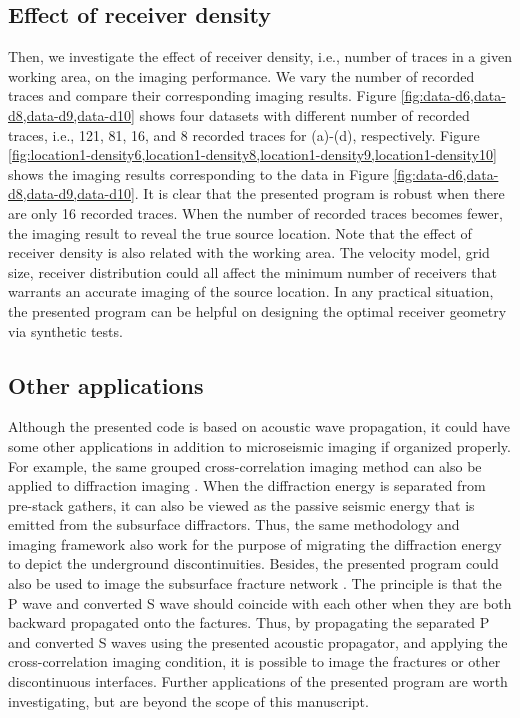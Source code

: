 \subsection{Effect of receiver density}
Then, we investigate the effect of receiver density, i.e., number of traces in a given working area, on the imaging performance. We vary the number of recorded traces and compare their corresponding imaging results. Figure \ref{fig:data-d6,data-d8,data-d9,data-d10} shows four datasets with different number of recorded traces, i.e.,  121, 81, 16, and 8 recorded traces for (a)-(d), respectively. Figure \ref{fig:location1-density6,location1-density8,location1-density9,location1-density10} shows the imaging results corresponding to the data in Figure \ref{fig:data-d6,data-d8,data-d9,data-d10}. It is clear that the presented program is robust when there are only 16 recorded traces. When the number of recorded traces becomes fewer, the imaging result  to reveal the true source location. Note that the effect of receiver density is also related with the working area. The velocity model, grid size, receiver distribution could all affect the minimum number of receivers that warrants an accurate imaging of the source location. In any practical situation, the presented program can be helpful on designing the optimal receiver geometry via synthetic tests.

\subsection{Other applications}
Although the presented code is based on acoustic wave propagation, it could have some other applications in addition to microseismic imaging if organized properly. For example, the same grouped cross-correlation imaging method can also be applied to diffraction imaging \cite[]{yin2017diffraction}. When the diffraction energy is separated from pre-stack gathers, it can also be viewed as the passive seismic energy that is emitted from the subsurface diffractors. Thus, the same methodology and imaging framework also work for the purpose of migrating the diffraction energy to depict the underground discontinuities. Besides, the presented program could also be used to image the subsurface fracture network \cite[]{huang2019passive}. The principle is that the P wave and converted S wave should coincide with each other when they are both backward propagated onto the factures. Thus, by propagating the separated P and converted S waves using the presented acoustic propagator, and applying the cross-correlation imaging condition, it is possible to image the fractures or other discontinuous interfaces.    Further applications of the presented program are worth investigating, but are beyond the scope of this manuscript.


